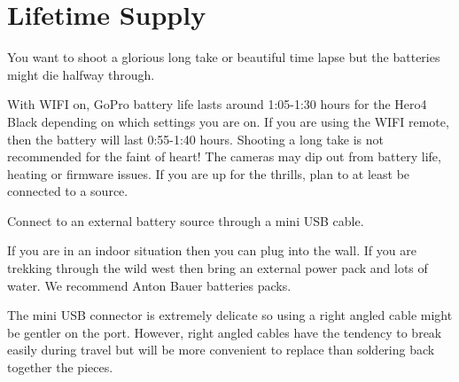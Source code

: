 \chapter{Lifetime Supply}
\pagecolor{white}
\label{chap:8}
\begin{fullwidth}


\problem

{\large You want to shoot a glorious long take or beautiful time lapse but the batteries might die halfway through. \par}

With WIFI on, GoPro battery life lasts around 1:05-1:30 hours for the Hero4 Black depending on which settings you are on. If you are using the WIFI remote, then the battery will last 0:55-1:40 hours. Shooting a long take is not recommended for the faint of heart! The cameras may dip out from battery life, heating or firmware issues. If you are up for the thrills, plan to at least be connected to a source. 


\solution

{\large Connect to an external battery source through a mini USB cable. \par}

If you are in an indoor situation then you can plug into the wall. If you are trekking through the wild west then bring an external power pack and lots of water. We recommend Anton Bauer batteries packs.


\tip The mini USB connector is extremely delicate so using a right angled cable might be gentler on the port. However, right angled cables have the tendency to break easily during travel but will be more convenient to replace than soldering back together the pieces. 





\clearpage
\end{fullwidth}

